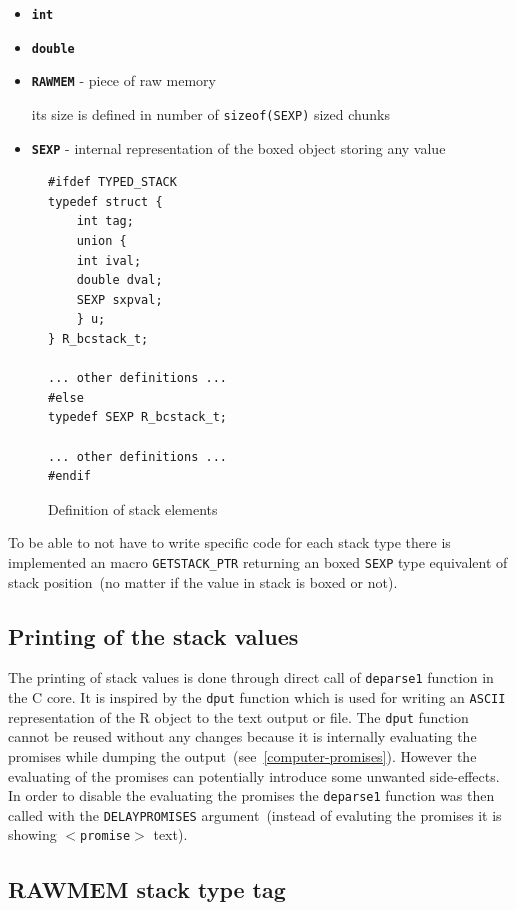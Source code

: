 \documentclass[thesis=M,english]{FITthesis}[2018/10/20]
\newcommand{\code}[1]{\texttt{#1}}
\begin{document}
\begin{itemize}
	\item \textbf{\code{int}}
	\item \textbf{\code{double}}
	\item \textbf{\code{RAWMEM}} - piece of raw memory

		its size is defined in number of \code{sizeof(SEXP)} sized  chunks
	\item \textbf{\code{SEXP}} - internal representation of the boxed object storing any value
\end{itemize}

\begin{figure}[h]
\begin{lstlisting}
#ifdef TYPED_STACK
typedef struct {
    int tag;
    union {
	int ival;
	double dval;
	SEXP sxpval;
    } u;
} R_bcstack_t;

... other definitions ...
#else
typedef SEXP R_bcstack_t;

... other definitions ...
#endif
\end{lstlisting}
	\caption{Definition of stack elements}\label{fig:stack-elements-definition}
\end{figure}

To be able to not have to write specific code for each stack type there is implemented an macro \code{GETSTACK{\_}PTR} returning an boxed \code{SEXP} type equivalent of stack position~(no matter if the value in stack is boxed or not).

\subsection{Printing of the stack values}\label{printing-stack-values}

The printing of stack values is done through direct call of \code{deparse1} function in the C core. It is inspired by the \code{dput} function which is used for writing an \code{ASCII} representation of the R object to the text output or file. The \code{dput} function cannot be reused without any changes because it is internally evaluating the promises while dumping the output~(see~\ref{computer-promises}). However the evaluating of the promises can potentially introduce some unwanted side-effects. In order to disable the evaluating the promises the \code{deparse1} function was then called with the \code{DELAYPROMISES} argument~(instead of evaluting the promises it is showing \code{$<$promise$>$} text).

\subsection{RAWMEM stack type tag}
\end{document}
